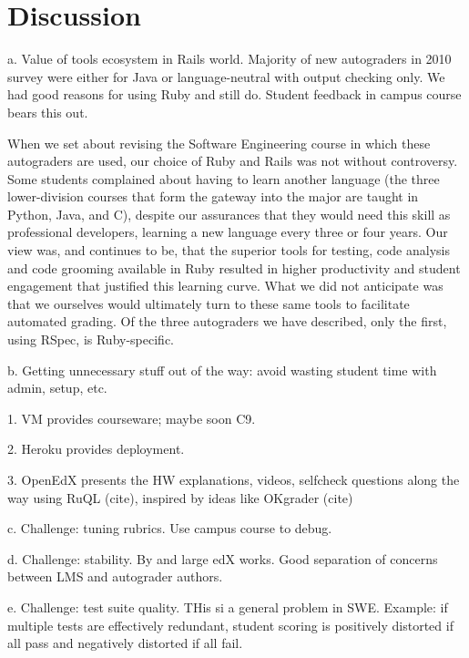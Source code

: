 \section{Discussion}



a.	Value of tools ecosystem in Rails world. Majority of new autograders in 2010 survey were either for Java or language-neutral with output checking only. We had good reasons for using Ruby and still do. Student feedback in campus course bears this out.


When we set about revising the Software Engineering course in which
these autograders are used, our choice of Ruby and Rails was not without
controversy.  Some students complained about having to learn another
language (the three lower-division courses that form the gateway into
the major are taught in Python, Java, and C), despite our assurances
that they would need this skill  as professional developers, learning a
new language every three or four years.  Our view was, and continues to
be, that the superior tools for testing, code analysis and code grooming
available in Ruby resulted in higher productivity and student engagement
that justified this learning curve.  What we did not anticipate was that
we ourselves would ultimately turn to these same tools to facilitate
automated grading.  Of the three autograders we have described, only the
first, using RSpec, is Ruby-specific.



b.	Getting unnecessary stuff out of the way: avoid wasting student time with admin, setup, etc.  

1.	VM provides courseware; maybe soon C9.  

2.	Heroku provides deployment.  

3.	OpenEdX presents the HW explanations, videos, selfcheck questions along the way using RuQL (cite), inspired by ideas like OKgrader (cite)

c.	Challenge: tuning rubrics. Use campus course to debug.

d.	Challenge: stability. By and large edX works.  Good separation
of concerns between LMS and autograder authors.

e.	Challenge: test suite quality. THis si a general problem in SWE. Example: if multiple tests are effectively redundant, student scoring is positively distorted if all pass and negatively distorted if all fail.



